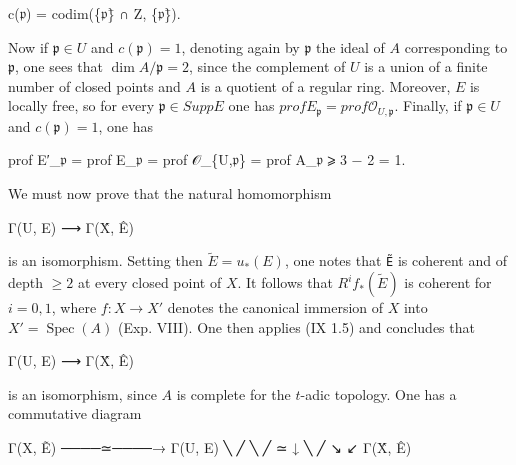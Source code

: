 \documentclass[
]{article}
\newenvironment{Shaded}{}{}
\newcommand{\NormalTok}[1]{#1}
\begin{document}
\begin{Shaded}
\begin{Highlighting}[]
\NormalTok{c(𝔭) = codim(\{𝔭\}̄ ∩ Z, \{𝔭\}̄).}
\end{Highlighting}
\end{Shaded}

Now if \(\mathfrak{p} \in U\) and \(c(\mathfrak{p}) = 1\), denoting
again by \(\mathfrak{p}\) the ideal of \(A\) corresponding to
\(\mathfrak{p}\), one sees that \(\dim A/\mathfrak{p} = 2\), since the
complement of \(U\) is a union of a finite number of closed points and
\(A\) is a quotient of a regular ring. Moreover, \(E\) is locally free,
so for every \(\mathfrak{p} \in Supp E\) one has
\(prof E_{\mathfrak{p}} = prof \mathcal{O}_{U,\mathfrak{p}}\). Finally,
if \(\mathfrak{p} \in U\) and \(c(\mathfrak{p}) = 1\), one has

\begin{Shaded}
\begin{Highlighting}[]
\NormalTok{prof E′\_𝔭 = prof E\_𝔭 = prof 𝒪\_\{U,𝔭\} = prof A\_𝔭 ⩾ 3 − 2 = 1.}
\end{Highlighting}
\end{Shaded}

We must now prove that the natural homomorphism

\begin{Shaded}
\begin{Highlighting}[]
\NormalTok{Γ(U, E) ⟶ Γ(X̂, Ê)}
\end{Highlighting}
\end{Shaded}

is an isomorphism. Setting then \(\tilde{E} = u_{*}(E)\), one notes that
\texttt{Ẽ} is coherent and of depth \(\geqslant 2\) at every closed
point of \(X\). It follows that \(R^{i} f_{*}(\tilde{E})\) is coherent
for \(i = 0, 1\), where \(f: X \to X'\) denotes the canonical immersion
of \(X\) into \(X' = \operatorname{Spec}(A)\) (Exp. VIII). One then
applies (IX 1.5) and concludes that

\begin{Shaded}
\begin{Highlighting}[]
\NormalTok{Γ(U, E) ⟶ Γ(X̂, Ê)}
\end{Highlighting}
\end{Shaded}

is an isomorphism, since \(A\) is complete for the \(t\)-adic topology.
One has a commutative diagram

\begin{Shaded}
\begin{Highlighting}[]
\NormalTok{       Γ(X, Ẽ) ────≃────→ Γ(U, E)}
\NormalTok{            ╲              ╱}
\NormalTok{             ╲            ╱}
\NormalTok{              ≃          ↓}
\NormalTok{               ╲        ╱}
\NormalTok{                ↘     ↙}
\NormalTok{                Γ(X̂, Ê)}
\end{Highlighting}
\end{Shaded}
\end{document}
